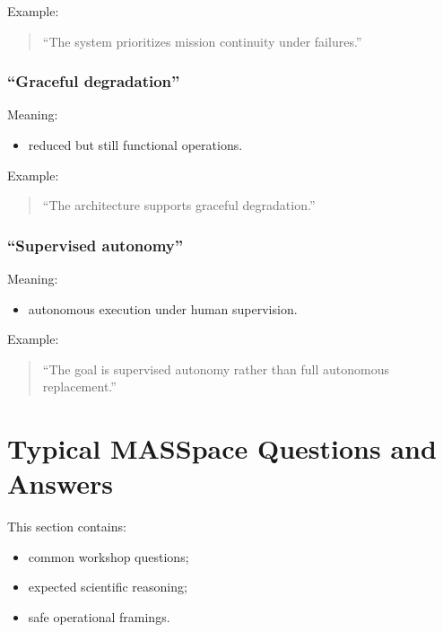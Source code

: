 \documentclass[10pt,a4paper,twocolumn]{article}
\begin{document}
Example:
\begin{quote}
    ``The system prioritizes mission continuity under failures.''
\end{quote}


\subsubsection*{``Graceful degradation''}

Meaning:
\begin{itemize}
    \item reduced but still functional operations.
\end{itemize}

Example:
\begin{quote}
    ``The architecture supports graceful degradation.''
\end{quote}


\subsubsection*{``Supervised autonomy''}

Meaning:
\begin{itemize}
    \item autonomous execution under human supervision.
\end{itemize}

Example:
\begin{quote}
    ``The goal is supervised autonomy rather than full autonomous replacement.''
\end{quote}



\section{Typical MASSpace Questions and Answers}

This section contains:
\begin{itemize}
    \item common workshop questions;
    \item expected scientific reasoning;
    \item safe operational framings.
\end{itemize}
\end{document}
